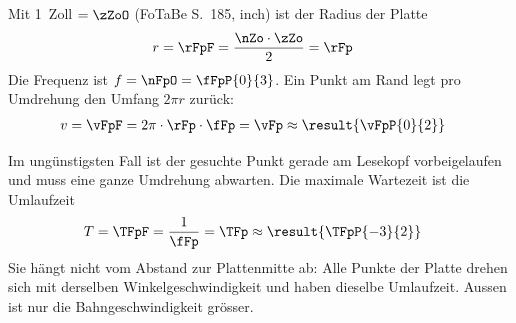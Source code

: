 \begin{abcliste}
\abc Mit 1~Zoll $= \zZoO$ (FoTaBe S.~185, inch) ist der Radius der Platte
\begin{align}
 r &= \rFpF = \frac{\nZo\cdot\zZo}{2} = \rFp
\end{align}
Die Frequenz ist $f = \nFpO = \fFpP{0}{3}$. Ein Punkt am Rand legt pro Umdrehung den Umfang $2\pi r$ zurück:
\begin{align}
 v &= \vFpF = 2\pi\cdot\rFp\cdot\fFp = \vFp \approx \result{\vFpP{0}{2}}
\end{align}

\abc Im ungünstigsten Fall ist der gesuchte Punkt gerade am Lesekopf vorbeigelaufen und muss eine ganze Umdrehung abwarten. Die maximale Wartezeit ist die Umlaufzeit
\begin{align}
 T &= \TFpF = \frac{1}{\fFp} = \TFp \approx \result{\TFpP{-3}{2}}
\end{align}
Sie hängt nicht vom Abstand zur Plattenmitte ab: Alle Punkte der Platte drehen sich mit derselben Winkelgeschwindigkeit und haben dieselbe Umlaufzeit. Aussen ist nur die Bahngeschwindigkeit grösser.
\end{abcliste}
